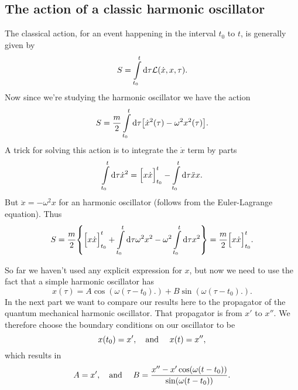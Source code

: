 \documentclass[11pt,letter, swedish, english
]{article}
\begin{document}
\subsection{The action of a classic harmonic oscillator}
The classical action, for an event happening in the interval $t_0$ to
$t$, is generally given by 
\begin{equation}
S=\int_{t_0}^{t}\rd\tau\mathcal{L}(\dot{x}, x, \tau).
\end{equation}
Now since we're studying the harmonic oscillator we have the action
\begin{equation}
S=\frac{m}{2}\int_{t_0}^{t}\rd\tau
\qty[\dot{x}^2(\tau)-\omega^2x^2(\tau)]. 
\end{equation}
A trick for solving this action is to integrate the $\dot{x}$ term by
parts
\begin{equation}
\int_{t_0}^{t}\rd\tau\dot{x}^2
=\Big[x\dot{x}\Big]_{t_0}^t-\int_{t_0}^{t}\rd\tau\ddot{x}x.
\end{equation}
But $\ddot{x}=-\omega^2x$ for an harmonic oscillator (follows from the
Euler-Lagrange equation). Thus
\begin{equation}\label{eq:3_S1}
S=\frac{m}{2} \qty{\Big[x\dot{x}\Big]_{t_0}^t
+\int_{t_0}^{t}\rd\tau \omega^2x^2
-\omega^2\int_{t_0}^{t}\rd\tau x^2}
=\frac{m}{2} \Big[x\dot{x}\Big]_{t_0}^t.
\end{equation}

So far we haven't used any explicit expression for $x$, but now we
need to use the fact that a simple harmonic oscillator has
\begin{equation}\label{eq:3_x}
x(\tau) = A\cos(\omega(\tau-t_0)\Big.) 
+B\sin(\omega(\tau-t_0)\Big.). 
\end{equation}
In the next part we want to compare our results here to the propagator
of the quantum mechanical harmonic oscillator. That propagator is
from $x'$ to $x''$. We therefore choose the boundary conditions on our
oscillator to be
\begin{equation}
x(t_0)=x'\qcomma\text{and }\quad x(t)=x'',
\end{equation}
which results in
\begin{equation}\label{eq:3_AB}
A=x'\qcomma\text{and }\quad
B=\frac{x''-x'\cos(\omega(t-t_0))}{\sin(\omega(t-t_0))}.
\end{equation}
\end{document}
